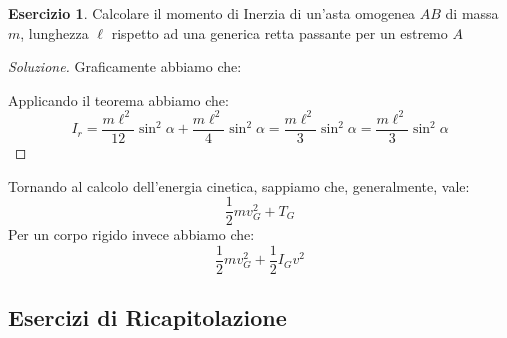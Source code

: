 \documentclass[11pt,a4paper,twoside]{article}
\theoremstyle{definition}
\newtheorem{ese}{Esercizio}[section]
\newenvironment{sol}
	{\renewcommand\qedsymbol{$\blacksquare$}\begin{proof}[Soluzione]}
	{\end{proof}}
\begin{document}
\begin{ese}
	Calcolare il momento di Inerzia di un'asta omogenea $AB$ di massa $m$, lunghezza $\ell$ rispetto ad una generica retta passante per un estremo $A$
\end{ese}
\begin{sol}
	Graficamente abbiamo che:
	\begin{center}
	\end{center}
	Applicando il teorema abbiamo che:
	\[ I_r = \frac{m\ell^2}{12} \sin^2\alpha + \frac{m\ell^2}4 \sin^2\alpha = \frac{m\ell^2}3 \sin^2\alpha = \frac{m\ell^2}3 \sin^2\alpha \]
\end{sol}

Tornando al calcolo dell'energia cinetica, sappiamo che, generalmente, vale:
\[ \frac 12 mv^2_G + T_G \]
Per un corpo rigido invece abbiamo che:
\[\frac 12 mv^2_G + \frac 12 I_Gv^2 \]

\subsection{Esercizi di Ricapitolazione}
\end{document}
